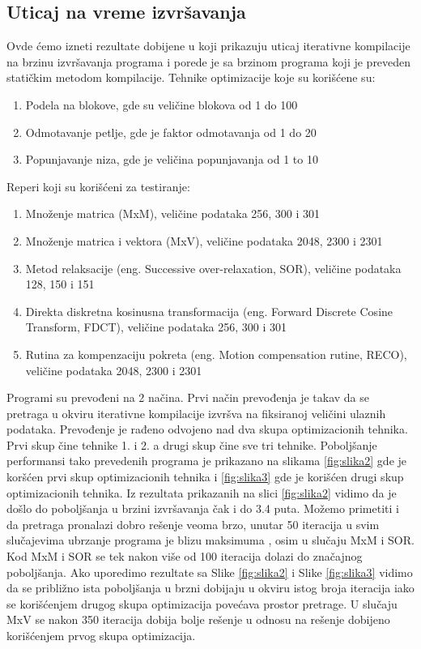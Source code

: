 \documentclass[a4paper]{article}
\begin{document}
\subsection{Uticaj na vreme izvršavanja}
\label{sec:uticaj}
  Ovde ćemo izneti rezultate dobijene u \cite{kisuki2000iterative} koji prikazuju uticaj iterativne kompilacije 
 na brzinu izvršavanja programa i porede je sa brzinom programa koji je preveden statičkim metodom kompilacije.
\newline Tehnike optimizacije koje su korišćene su:
\begin{enumerate}
\item Podela na blokove, gde su veličine blokova od 1 do 100
\item Odmotavanje petlje, gde je faktor odmotavanja od 1 do 20
\item Popunjavanje niza, gde je veličina popunjavanja od 1 to 10
\end{enumerate}
Reperi koji su korišćeni za testiranje:
\begin{enumerate}
\item Množenje matrica (MxM), veličine podataka 256, 300 i 301
\item Množenje matrica i vektora (MxV), veličine podataka 2048, 2300 i 2301 
\item Metod relaksacije (eng. Successive over-relaxation, SOR), veličine podataka 128, 150 i 151
\item Direkta diskretna kosinusna transformacija (eng. Forward Discrete Cosine Transform, FDCT), veličine podataka 256, 300 i 301
\item Rutina za kompenzaciju pokreta (eng. Motion compensation rutine, RECO), veličine podataka 2048, 2300 i 2301
\end{enumerate}
Programi su prevođeni na 2 načina.
Prvi način prevođenja je takav da se pretraga u okviru iterativne kompilacije izvršva na 
fiksiranoj veličini ulaznih podataka. Prevođenje je rađeno odvojeno nad dva skupa
optimizacionih tehnika. Prvi skup čine tehnike 1. i 2. a drugi skup čine sve tri tehnike. Poboljšanje performansi 
tako prevedenih programa je prikazano na slikama \ref{fig:slika2} gde je koršćen prvi skup optimizacionih tehnika i 
\ref{fig:slika3} gde je korišćen drugi skup optimizacionih tehnika. Iz rezultata prikazanih na slici \ref{fig:slika2} vidimo da
je došlo do poboljšanja u brzini izvršavanja čak i do 3.4 puta. Možemo primetiti i da pretraga pronalazi 
dobro rešenje veoma brzo, unutar 50 iteracija u svim slučajevima ubrzanje programa je blizu maksimuma
, osim u slučaju MxM i SOR. Kod MxM i SOR se tek nakon više od 100 iteracija dolazi do značajnog poboljšanja.
Ako uporedimo rezultate sa Slike \ref{fig:slika2} i Slike \ref{fig:slika3} vidimo da se približno ista poboljšanja
u brzni dobijaju u okviru istog broja iteracija iako se korišćenjem drugog skupa optimizacija povećava prostor 
pretrage. U slučaju MxV se nakon 350 iteracija dobija bolje rešenje u odnosu na rešenje dobijeno korišćenjem prvog skupa 
optimizacija.
\end{document}
